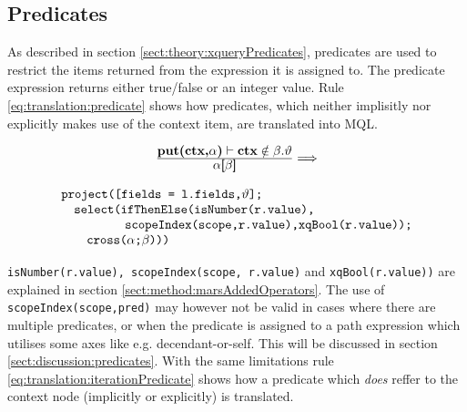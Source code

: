 \subsection{Predicates}
As described in section \ref{sect:theory:xqueryPredicates}, predicates are used to restrict the items returned
from the expression it is assigned to. The predicate expression returns either true/false or an integer value. Rule
\ref{eq:translation:predicate} shows how predicates, which neither implisitly nor explicitly makes use of the
context item, are translated into MQL. 

\begin{equation}
\centering
\begin{array}{c}
	\frac{\displaystyle \textbf{put(ctx,}\alpha\textbf{)}\vdash\textbf{ctx}\notin\beta.\vartheta}
	{\displaystyle \alpha\textsf{[}\beta\textsf{]}}

	\Longrightarrow 
	\\
	\mbox{}
	\\
	\begin{array}{l}
		\mbox{\texttt{project([fields = l.fields,}} \vartheta \mbox{\texttt{];}} 
		\\ \quad \mbox{\texttt{select(ifThenElse(isNumber(r.value),}} \\ \quad 
		\qquad\qquad \mbox{\texttt{scopeIndex(scope,r.value),xqBool(r.value));}} \\ \quad\quad
		\mbox{\texttt{cross(}} 
		\alpha \texttt{;}
		\beta \mbox{\texttt{)))}}
	\end{array}
\end{array}
\label{eq:translation:predicate}
\end{equation}


\texttt{isNumber(r.value), scopeIndex(scope, r.value)} and \texttt{xqBool(r.value))} are explained in section
\ref{sect:method:marsAddedOperators}. The use of \texttt{scopeIndex(scope,pred)} may however not be valid in cases
where there are multiple predicates, or when the predicate is assigned to a path expression which utilises some
axes like e.g. \textsf{decendant-or-self}. This will be discussed in section \ref{sect:discussion:predicates}.
With the same limitations rule \ref{eq:translation:iterationPredicate} shows how a predicate which \emph{does}
reffer to the context node (implicitly or explicitly) is translated.

